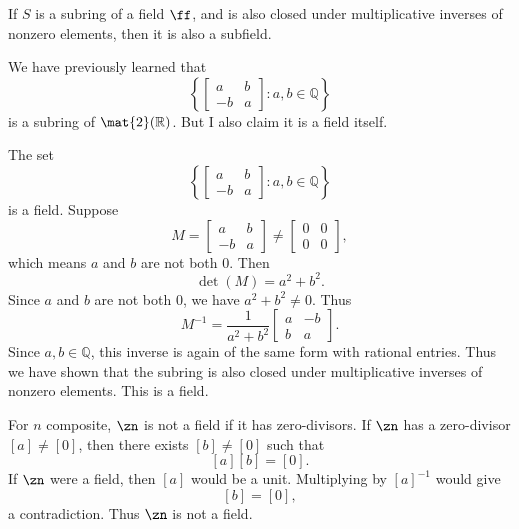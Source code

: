 \begin{definition}[Subfield]
    If $S$ is a subring of a field $\ff$, and is also closed under multiplicative inverses of nonzero elements, then it is also a subfield.
\end{definition}

We have previously learned that
\[
    \left\{
        \begin{bmatrix}
            a&b\\
            -b&a
        \end{bmatrix}
        :a,b\in\mathbb{Q}
    \right\}
\]
is a subring of $\mat{2}(\mathbb{R})$.
But I also claim it is a field itself.

\begin{proposition}{
    The set
    \[
        \left\{
            \begin{bmatrix}
                a&b\\
                -b&a
            \end{bmatrix}
            :a,b\in\mathbb{Q}
        \right\}
    \]
    is a field.
}
    Suppose
    \[
        M=
        \begin{bmatrix}
            a&b\\
            -b&a
        \end{bmatrix}
        \neq
        \begin{bmatrix}
            0&0\\
            0&0
        \end{bmatrix},
    \]
    which means $a$ and $b$ are not both $0$.
    Then
    \[
        \det(M)=a^2+b^2.
    \]
    Since $a$ and $b$ are not both $0$, we have $a^2+b^2\neq 0$.
    Thus
    \[
        M^{-1}=\frac{1}{a^2+b^2}
        \begin{bmatrix}
            a&-b\\
            b&a
        \end{bmatrix}.
    \]
    Since $a,b\in\mathbb{Q}$, this inverse is again of the same form with rational entries.
    Thus we have shown that the subring is also closed under multiplicative inverses of nonzero elements.
    This is a field.
\end{proposition}

\begin{lemma}{
    For $n$ composite, $\zn$ is not a field if it has zero-divisors.
}
    If $\zn$ has a zero-divisor $[a]\neq [0]$, then there exists $[b]\neq [0]$ such that
    \[
        [a][b]=[0].
    \]
    If $\zn$ were a field, then $[a]$ would be a unit.
    Multiplying by $[a]^{-1}$ would give
    \[
        [b]=[0],
    \]
    a contradiction.
    Thus $\zn$ is not a field.
\end{lemma}

